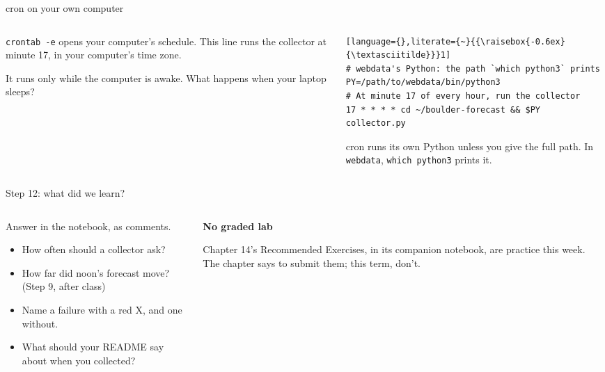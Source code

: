 \documentclass[9pt,aspectratio=169]{beamer}
\begin{document}
\begin{frame}[fragile]{cron on your own computer}
    \begin{columns}[T]
        \begin{column}{0.37\textwidth}
            \texttt{crontab -e} opens your computer's schedule. This line runs the collector at minute 17, in your computer's time zone.

            \medskip
            It runs only while the computer is awake. What happens when your laptop sleeps?
        \end{column}
        \begin{column}{0.6\textwidth}
\begin{lstlisting}[language={},literate={~}{{\raisebox{-0.6ex}{\textasciitilde}}}1]
# webdata's Python: the path `which python3` prints
PY=/path/to/webdata/bin/python3
# At minute 17 of every hour, run the collector
17 * * * * cd ~/boulder-forecast && $PY collector.py
\end{lstlisting}
            \medskip
            {\footnotesize cron runs its own Python unless you give the full path. In \texttt{webdata}, \texttt{which python3} prints it.\par}
        \end{column}
    \end{columns}
\end{frame}

\begin{frame}{Step 12: what did we learn?}
    \begin{columns}[T]
        \begin{column}{0.6\textwidth}
            Answer in the notebook, as comments.
            \begin{itemize}\small
                \item How often should a collector ask?
                \item How far did noon's forecast move? (Step 9, after class)
                \item Name a failure with a red X, and one without.
                \item What should your README say about when you collected?
            \end{itemize}
        \end{column}
        \begin{column}{0.35\textwidth}
            \textbf{No graded lab}\\[2pt]
            {\footnotesize Chapter 14's Recommended Exercises, in its companion notebook, are practice this week. The chapter says to submit them; this term, don't.\par}
        \end{column}
    \end{columns}
\end{frame}
\end{document}
